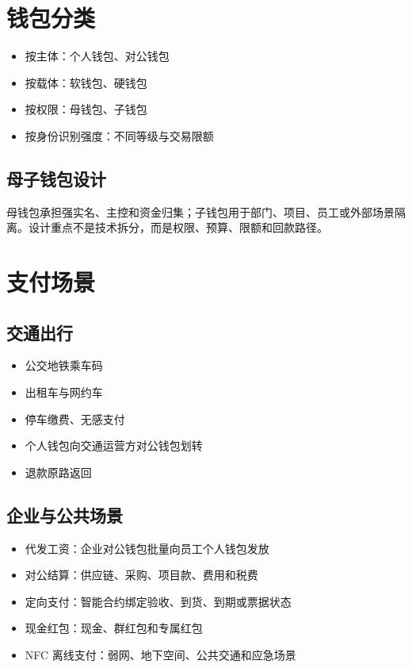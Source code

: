 \section{钱包分类}\label{ux94b1ux5305ux5206ux7c7b}

\begin{itemize}
\tightlist
\item
  按主体：个人钱包、对公钱包
\item
  按载体：软钱包、硬钱包
\item
  按权限：母钱包、子钱包
\item
  按身份识别强度：不同等级与交易限额
\end{itemize}

\subsection{母子钱包设计}\label{ux6bcdux5b50ux94b1ux5305ux8bbeux8ba1}

母钱包承担强实名、主控和资金归集；子钱包用于部门、项目、员工或外部场景隔离。设计重点不是技术拆分，而是权限、预算、限额和回款路径。

\section{支付场景}\label{ux652fux4ed8ux573aux666f}

\subsection{交通出行}\label{ux4ea4ux901aux51faux884c}

\begin{itemize}
\tightlist
\item
  公交地铁乘车码
\item
  出租车与网约车
\item
  停车缴费、无感支付
\item
  个人钱包向交通运营方对公钱包划转
\item
  退款原路返回
\end{itemize}

\subsection{企业与公共场景}\label{ux4f01ux4e1aux4e0eux516cux5171ux573aux666f}

\begin{itemize}
\tightlist
\item
  代发工资：企业对公钱包批量向员工个人钱包发放
\item
  对公结算：供应链、采购、项目款、费用和税费
\item
  定向支付：智能合约绑定验收、到货、到期或票据状态
\item
  现金红包：现金、群红包和专属红包
\item
  NFC 离线支付：弱网、地下空间、公共交通和应急场景
\end{itemize}

